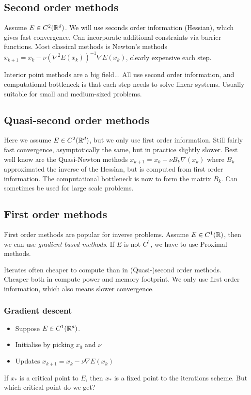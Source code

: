 \documentclass[12pt]{article}
\begin{document}
\subsection{Second order methods}
Assume $E\in C^2(\mathbb{R}^d)$. We will use seconds order information (Hessian), which gives fast convergence. Can incorporate additional constraints via barrier functions. Most classical methods is Newton's methods $x_{k+1} = x_k - \nu (\nabla^2E(x_k))^{-1}\nabla E(x_k)$, clearly expensive each step.

Interior point methods are a big field... All use second order information, and computational bottleneck is that each step needs to solve linear systems. Usually suitable for small and medium-sized problems.


\subsection{Quasi-second order methods}
Here we assume $E\in C^2(\mathbb{R}^d)$, but we only use first order information. Still fairly fast convergence, asymptotically the same, but in practice slightly slower. Best well know are the Quasi-Newton methods $x_{k+1} = x_k - \nu B_k \nabla(x_k)$ where $B_k$ approximated the inverse of the Hessian, but is computed from first order information. The computational bottleneck is now to form the matrix $B_k$. Can sometimes be used for large scale problems. 

\subsection{First order methods}
First order methods are popular for inverse problems. Assume $E\in C^1(\mathbb{R})$, then we can use \textit{gradient based methods}. If $E$ is not $C^1$, we have to use Proximal methods.

Iterates often cheaper to compute than in (Quasi-)second order methods. Cheaper both in compute power and memory footprint. We only use first order information, which also means slower convergence. 

\subsubsection{Gradient descent}
\begin{itemize}
    \item Suppose $E\in C^1(\mathbb{R}^d)$.
    \item Initialise by picking $x_0$ and $\nu$
    \item Updates $x_{k+1} = x_k - \nu\nabla E(x_k)$
\end{itemize}
If $x_*$ is a critical point to $E$, then $x_*$ is a fixed point to the iterations scheme. But which critical point do we get? 
\end{document}
